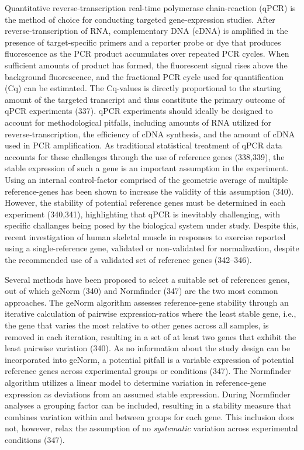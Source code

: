 \documentclass[twoside,10pt]{gihclass} %
\begin{document}
Quantitative reverse-transcription real-time polymerase chain-reaction (qPCR) is the method of choice for conducting targeted gene-expression studies.
After reverse-transcription of RNA, complementary DNA (cDNA) is amplified in the presence of target-specific primers and a reporter probe or dye that produces fluorescence as the PCR product accumulates over repeated PCR cycles. When sufficient amounts of product has formed, the fluorescent signal rises above the background fluorescence, and the fractional PCR cycle used for quantification (Cq) can be estimated. The Cq-values is directly proportional to the starting amount of the targeted transcript and thus constitute the primary outcome of qPCR experiments
(337).
qPCR experiments should ideally be designed to account for methodological pitfalls, including amounts of RNA utilized for reverse-transcription, the efficiency of cDNA synthesis, and the amount of cDNA used in PCR amplification.
As traditional statistical treatment of qPCR data accounts for these challenges through the use of reference genes (338,339), the stable expression of such a gene is an important assumption in the experiment.
Using an internal control-factor comprised of the geometric average of multiple reference-genes has been shown to increase the validity of this assumption (340).
However, the stability of potential reference genes must be determined in each experiment (340,341), highlighting that qPCR is inevitably challenging, with specific challanges being posed by the biological system under study.
Despite this, recent investigation of human skeletal muscle in responses to exercise reported using a single-reference gene, validated or non-validated for normalization, despite the recommended use of a validated set of reference genes (342--346).

Several methods have been proposed to select a suitable set of references genes, out of which geNorm (340) and Normfinder (347) are the two most common approaches.
The geNorm algorithm assesses reference-gene stability through an iterative calculation of pairwise expression-ratios where the least stable gene, i.e., the gene that varies the most relative to other genes across all samples, is removed in each iteration, resulting in a set of at least two genes that exhibit the least pairwise variation (340).
As no information about the study design can be incorporated into geNorm, a potential pitfall is a variable expression of potential reference genes across experimental groups or conditions (347).
The Normfinder algorithm utilizes a linear model to determine variation in reference-gene expression as deviations from an assumed stable expression.
During Normfinder analyses a grouping factor can be included, resulting in a stability measure that combines variation within and between groups for each gene.
This inclusion does not, however, relax the assumption of no \emph{systematic} variation across experimental conditions (347).
\end{document}
